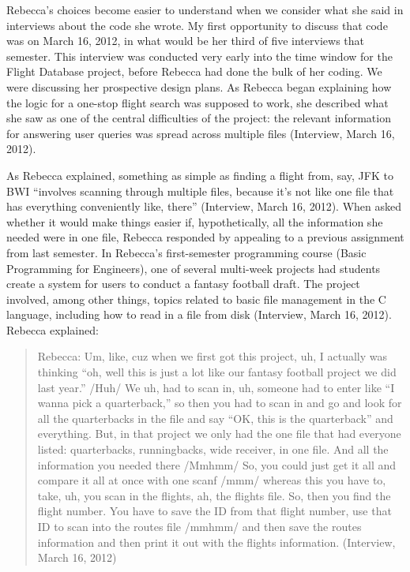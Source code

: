 Rebecca's choices become easier to understand when we consider what she said in  interviews about the code she wrote. My first opportunity to discuss that code was on March 16, 2012, in what would be her third of five interviews that semester. This interview was conducted very early into the time window for the Flight Database project, before Rebecca had done the bulk of her coding. We were discussing her prospective design plans. As Rebecca began explaining how the logic for a one-stop flight search was supposed to work, she described what she saw as one of the central difficulties of the project: the relevant information for answering user queries was spread across multiple files (Interview, March 16, 2012).

As Rebecca explained, something as simple as finding a flight from, say, JFK to BWI ``involves scanning through multiple files, because it's not like one file that has everything conveniently like, there'' (Interview, March 16, 2012). When asked whether it would make things easier if, hypothetically, all the information she needed were in one file, Rebecca responded by appealing to a previous assignment from last semester. In Rebecca's first-semester programming course (Basic Programming for Engineers), one of several multi-week projects had students create a system for users to conduct a fantasy football draft. The project involved, among other things, topics related to basic file management in the C language, including how to read in a file from disk (Interview, March 16, 2012). Rebecca explained:


\begin{quote}
  Rebecca: Um, like, cuz when we first got this project, uh, I actually was thinking ``oh, well this is just a lot like our fantasy football project we did last year.'' /Huh/ We uh, had to scan in, uh, someone had to enter like ``I wanna pick a quarterback,'' so then you had to scan in and go and look for all the quarterbacks in the file and say ``OK, this is the quarterback'' and everything. But, in that project we only had the one file that had everyone listed: quarterbacks, runningbacks, wide receiver, in one file. And all the information you needed there /Mmhmm/ So, you could just get it all and compare it all at once with one scanf /mmm/ whereas this you have to, take, uh, you scan in the flights, ah, the flights file. So, then you find the flight number. You have to save the ID from that flight number, use that ID to scan into the routes file /mmhmm/ and then save the routes information and then print it out with the flights information. (Interview, March 16, 2012)
\end{quote}


